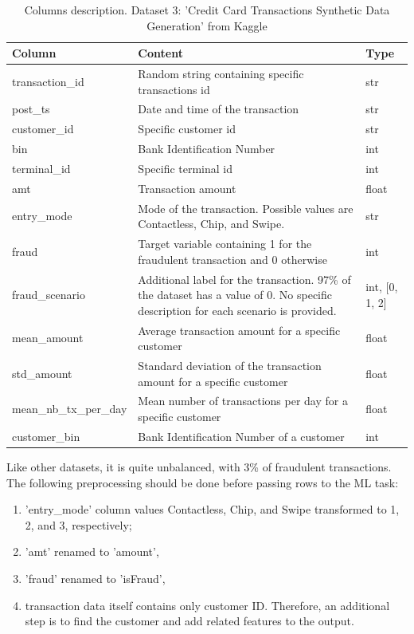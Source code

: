 \documentclass[12pt,a4paper, hidelinks]{article}
\begin{document}
\begin{table}[ht!]
    \centering
    \begin{tabular}{|p{4.5cm}|p{8cm}|p{2cm}|}
    \hline
    \textbf{Column} & \textbf{Content} & \textbf{Type} \\
    \hline
    transaction\_id & Random string containing specific transactions id & str \\
    \hline
    post\_ts & Date and time of the transaction & str \\
    \hline
    customer\_id & Specific customer id & str \\
    \hline
    bin & Bank Identification Number & int \\
    \hline
    terminal\_id & Specific terminal id & int \\
    \hline
    amt & Transaction amount & float \\
    \hline
    entry\_mode & Mode of the transaction. Possible values are Contactless, Chip, and Swipe. & str \\
    \hline 
    fraud & Target variable containing 1 for the fraudulent transaction and 0 otherwise & int \\
    \hline
    fraud\_scenario & Additional label for the transaction. 97\% of the dataset has a value of 0. No specific description for each scenario is provided.  & int, [0, 1, 2] \\
    \hline
    mean\_amount & Average transaction amount for a specific customer  & float \\
    \hline
    std\_amount & Standard deviation of the transaction amount for a specific customer  & float \\
    \hline
    mean\_nb\_tx\_per\_day & Mean number of transactions per day for a specific customer & float \\
    \hline
    customer\_bin & Bank Identification Number of a customer & int \\
    \hline
    \end{tabular}
    \caption{Columns description. Dataset 3: 'Credit Card Transactions Synthetic Data Generation' from Kaggle}
\end{table}

Like other datasets, it is quite unbalanced, with 3\% of fraudulent transactions. The following preprocessing should be done before passing rows to the ML task:
\begin{enumerate}
    \item 'entry\_mode' column values Contactless, Chip, and Swipe transformed to 1, 2, and 3, respectively;
    \item 'amt' renamed to 'amount',
    \item 'fraud' renamed to 'isFraud',
    \item transaction data itself contains only customer ID. Therefore, an additional step is to find the customer and add related features to the output.
\end{enumerate}
\end{document}
